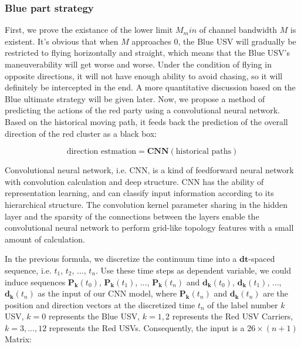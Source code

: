 \documentclass{mcmthesis}
\begin{document}
\subsubsection{Blue part strategy}

First, we prove the existance of the lower limit $M_min$ of channel bandwidth $M$ is existent. It's obvious that when $M$ approaches $0$, the Blue USV will gradually be restricted to flying horizontally and straight, which means that the Blue USV's maneuverability will get worse and worse. Under the condition of flying in opposite directions, it will not have enough ability to avoid chasing, so it will definitely be intercepted in the end. A more quantitative discussion based on the Blue ultimate strategy will be given later. Now, we propose a method of predicting the actions of the red party using a convolutional neural network. Based on the historical moving path, it feeds back the prediction of the overall direction of the red cluster as a black box: \par

\begin{equation}
\mbox{direction estmation} = \mathbf{CNN}({\mbox{historical paths}})
\end{equation}

Convolutional neural network, i.e. CNN, is a kind of feedforward neural network with convolution calculation and deep structure. CNN has the ability of representation learning, and can classify input information according to its hierarchical structure. The convolution kernel parameter sharing in the hidden layer and the sparsity of the connections between the layers enable the convolutional neural network to perform grid-like topology features with a small amount of calculation. \par

In the previous formula, we discretize the continuum time into a $\mathbf{dt}$-spaced sequence, i.e. $t_1$, $t_2$, ..., $t_n$.  Use these time steps as dependent variable, we could induce sequences $\mathbf{P_{k}}(t_0)$, $\mathbf{P_{k}}(t_1)$, ..., $\mathbf{P_{k}}(t_n)$ and $\mathbf{d_{k}}(t_0)$, $\mathbf{d_{k}}(t_1)$, ..., $\mathbf{d_{k}}(t_n)$  as the input of our CNN model, where $\mathbf{P_{k}}(t_n)$ and $\mathbf{d_{k}}(t_n)$ are the position and direction vectors at the discretized time $t_n$ of the label number $k$ USV, $k=0$ represents the Blue USV, $k = 1, 2$ represents the Red USV Carriers, $k=3,...,12$ represents the Red USVs. Consequently, the input is a $26 \times (n+1)$ Matrix:
\end{document}
